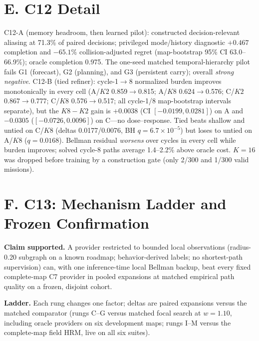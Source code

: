 \documentclass[letterpaper]{article} %
\newcommand{\stage}[1]{\textsc{#1}}
\begin{document}
\section{E. \stage{C12} Detail}

\stage{C12-A} (memory headroom, then learned pilot): constructed decision-relevant aliasing at 71.3\% of paired decisions; privileged mode/history diagnostic $+0.467$ completion and $-65.1$\% collision-adjusted regret (map-bootstrap 95\% CI 63.0--66.9\%); oracle completion 0.975. The one-seed matched temporal-hierarchy pilot fails G1 (forecast), G2 (planning), and G3 (persistent carry); overall \emph{strong negative}. \stage{C12-B} (tied refiner): cycle-1$\to$8 normalized burden improves monotonically in every cell (A/$K2$ 0.859$\to$0.815; A/$K8$ 0.624$\to$0.576; C/$K2$ 0.867$\to$0.777; C/$K8$ 0.576$\to$0.517; all cycle-1/8 map-bootstrap intervals separate), but the $K8{-}K2$ gain is $+0.0038$ (CI $[-0.0199, 0.0281]$) on A and $-0.0305$ ($[-0.0726, 0.0096]$) on C---no dose--response. Tied beats shallow and untied on C/$K8$ (deltas 0.0177/0.0076, BH $q{=}6.7{\times}10^{-5}$) but loses to untied on A/$K8$ ($q{=}0.0168$). Bellman residual \emph{worsens} over cycles in every cell while burden improves; solved cycle-8 paths average 1.4--2.2\% above oracle cost. $K{=}16$ was dropped before training by a construction gate (only 2/300 and 1/300 valid missions).

\section{F. C13: Mechanism Ladder and Frozen Confirmation}

\textbf{Claim supported.} A provider restricted to bounded local observations (radius-0.20 subgraph on a known roadmap; behavior-derived labels; no shortest-path supervision) can, with one inference-time local Bellman backup, beat every fixed complete-map \stage{C7} provider in pooled expansions at matched empirical path quality on a frozen, disjoint cohort.

\textbf{Ladder.} Each rung changes one factor; deltas are paired expansions versus the matched comparator (rungs C--G versus matched focal search at $w{=}1.10$, including oracle providers on six development maps; rungs I--M versus the complete-map field HRM, live on all six suites).
\end{document}
